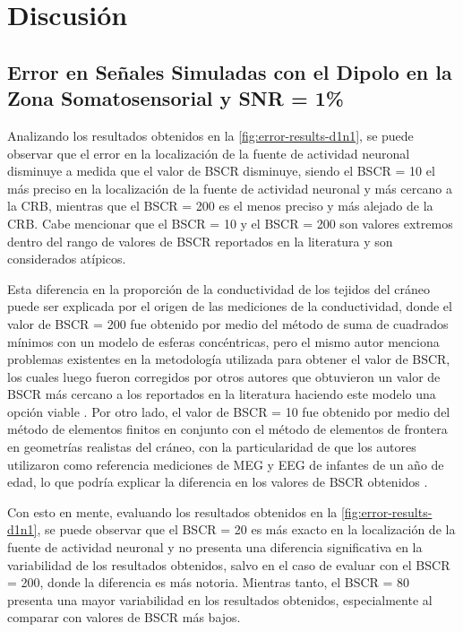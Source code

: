 %
\chapter{Discusión}
\label{sec:discusion}

\section{Error en Señales Simuladas con
el Dipolo en la Zona Somatosensorial y SNR = 1\%}
\label{sec:discusion:d1n1}

Analizando los resultados obtenidos en la \cref{fig:error-results-d1n1}, se puede observar que el error en la localización de la fuente de actividad neuronal disminuye a medida que el valor de BSCR disminuye, siendo el BSCR = 10 el más preciso en la localización de la fuente de actividad neuronal y más cercano a la CRB, mientras que el BSCR = 200 es el menos preciso y más alejado de la CRB.
Cabe mencionar que el BSCR = 10 y el BSCR = 200 son valores extremos dentro del rango de valores de BSCR reportados en la literatura y son considerados atípicos. 

Esta diferencia en la proporción de la conductividad de los tejidos del cráneo puede ser explicada por el origen de las mediciones de la conductividad, donde el valor de BSCR = 200 fue obtenido por medio del método de suma de cuadrados mínimos con un modelo de esferas concéntricas, pero el mismo autor menciona problemas existentes en la metodología utilizada para obtener el valor de BSCR, los cuales luego fueron corregidos por otros autores que obtuvieron un valor de BSCR más cercano a los reportados en la literatura haciendo este modelo una opción viable \cite{eriksenVivoHumanHead1990, Gutierrez2004}. 
Por otro lado, el valor de BSCR = 10 fue obtenido por medio del método de elementos finitos en conjunto con el método de elementos de frontera en geometrías realistas del cráneo, con la particularidad de que los autores utilizaron como referencia mediciones de MEG y EEG de infantes de un año de edad, lo que podría explicar la diferencia en los valores de BSCR obtenidos \cite{acarHighresolutionEEGSource2016}.

Con esto en mente, evaluando los resultados obtenidos en la \cref{fig:error-results-d1n1}, se puede observar que el BSCR = 20 es más exacto en la localización de la fuente de actividad neuronal y no presenta una diferencia significativa en la variabilidad de los resultados obtenidos, salvo en el caso de evaluar con el BSCR = 200, donde la diferencia es más notoria. 
Mientras tanto, el BSCR = 80 presenta una mayor variabilidad en los resultados obtenidos, especialmente al comparar con valores de BSCR más bajos.  

